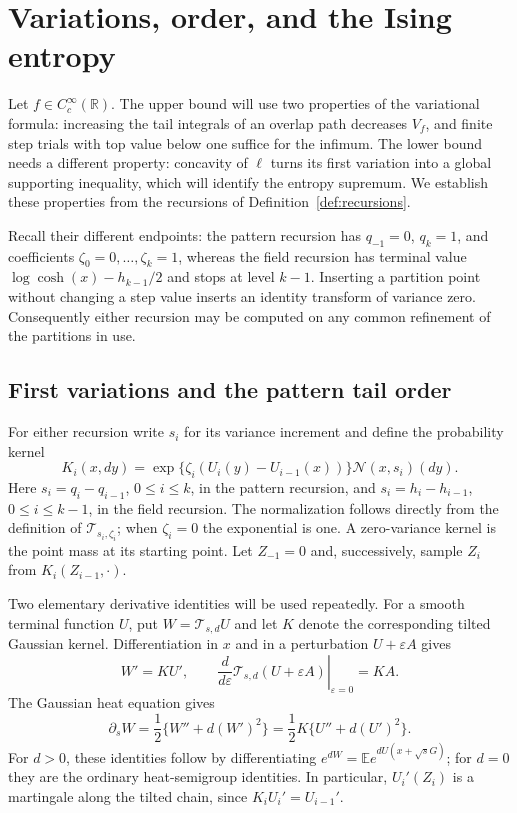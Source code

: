 \section{Variations, order, and the Ising entropy}
\label{var:section}

Let $f\in C_c^\infty(\mathbb R)$. The upper bound will use two
properties of the variational formula: increasing the tail integrals of
an overlap path decreases $V_f$, and finite step trials with top value
below one suffice for the infimum. The lower bound needs a different
property: concavity of $\ell$ turns its first variation into a global
supporting inequality, which will identify the entropy supremum.
We establish these properties from the recursions of
Definition~\ref{def:recursions}.

Recall their different endpoints:
the pattern recursion has $q_{-1}=0$, $q_k=1$, and coefficients
$\zeta_0=0,\ldots,\zeta_k=1$, whereas the field recursion has
terminal value $\log\cosh(x)-h_{k-1}/2$ and stops at level $k-1$.
Inserting a partition point without changing a step value inserts an
identity transform of variance zero. Consequently either recursion may
be computed on any common refinement of the partitions in use.

\subsection{First variations and the pattern tail order}

For either recursion write $s_i$ for its variance increment and define
the probability kernel
\begin{equation}
\label{var:kernel}
 K_i(x,dy)=
 \exp\{\zeta_i(U_i(y)-U_{i-1}(x))\}
 \mathcal N(x,s_i)(dy).
\end{equation}
Here $s_i=q_i-q_{i-1}$, $0\le i\le k$, in the pattern
recursion, and $s_i=h_i-h_{i-1}$, $0\le i\le k-1$, in
the field recursion. The normalization follows directly from the
definition of $\mathcal T_{s_i,\zeta_i}$; when $\zeta_i=0$
the exponential is one. A zero-variance kernel is the point mass at
its starting point. Let $Z_{-1}=0$ and, successively, sample $Z_i$
from $K_i(Z_{i-1},\cdot)$.

Two elementary derivative identities will be used repeatedly. For a
smooth terminal function $U$, put $W=\mathcal T_{s,d}U$ and let
$K$ denote the corresponding tilted Gaussian kernel. Differentiation
in $x$ and in a perturbation $U+\varepsilon A$ gives
\begin{equation}
\label{var:transform-derivatives}
 W'=K U',\qquad
 \left.\frac{d}{d\varepsilon}
 \mathcal T_{s,d}(U+\varepsilon A)\right|_{\varepsilon=0}=K A.
\end{equation}
The Gaussian heat equation gives
\begin{equation}
\label{var:generator}
 \partial_s W
 =\frac12\{W''+d(W')^2\}
 =\frac12 K\{U''+d(U')^2\}.
\end{equation}
For $d>0$, these identities follow by differentiating
$e^{dW}=\mathbb E e^{dU(x+\sqrt sG)}$; for $d=0$ they
are the ordinary heat-semigroup identities. In particular,
$U_i'(Z_i)$ is a martingale along the tilted chain, since
$K_iU_i'=U_{i-1}'$.

